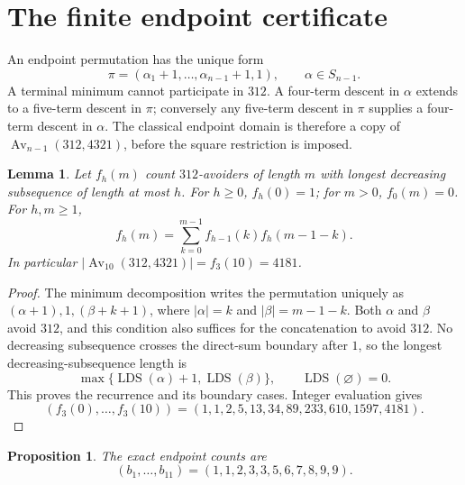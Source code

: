 \documentclass[11pt,a4paper]{article}
\newtheorem{lemma}[theorem]{Lemma}
\newtheorem{proposition}[theorem]{Proposition}
\DeclareMathOperator{\Av}{Av}
\DeclareMathOperator{\LDS}{LDS}
\begin{document}
\section{The finite endpoint certificate}

An endpoint permutation has the unique form
\[
 \pi=(\alpha_1+1,\ldots,\alpha_{n-1}+1,1),\qquad\alpha\in S_{n-1}.
\]
A terminal minimum cannot participate in $312$. A four-term descent in
$\alpha$ extends to a five-term descent in $\pi$; conversely any five-term
descent in $\pi$ supplies a four-term descent in $\alpha$.
The classical endpoint domain is therefore a copy of
$\Av_{n-1}(312,4321)$, before the square restriction is imposed.

\begin{lemma}\label{lem:domain}
Let $f_h(m)$ count $312$-avoiders of length $m$ with longest decreasing
subsequence of length at most $h$. For $h\geq0$, $f_h(0)=1$; for $m>0$,
$f_0(m)=0$. For $h,m\geq1$,
\begin{equation}\label{eq:domain}
 f_h(m)=\sum_{k=0}^{m-1}f_{h-1}(k)f_h(m-1-k).
\end{equation}
In particular $|\Av_{10}(312,4321)|=f_3(10)=4181$.
\end{lemma}

\begin{proof}
The minimum decomposition writes the permutation uniquely as
$(\alpha+1),1,(\beta+k+1)$, where $|\alpha|=k$ and
$|\beta|=m-1-k$. Both $\alpha$ and $\beta$ avoid $312$, and this condition
also suffices for the concatenation to avoid $312$.
No decreasing subsequence crosses the direct-sum boundary after $1$, so
the longest decreasing-subsequence length is
\[
 \max\{\LDS(\alpha)+1,\LDS(\beta)\},\qquad\LDS(\varnothing)=0.
\]
This proves the recurrence and its boundary cases. Integer evaluation gives
\[
 (f_3(0),\ldots,f_3(10))=(1,1,2,5,13,34,89,233,610,1597,4181).
\]
\end{proof}

\begin{proposition}\label{prop:finite}
The exact endpoint counts are
\[
 (b_1,\ldots,b_{11})=(1,1,2,3,3,5,6,7,8,9,9).
\]
\end{proposition}
\end{document}
